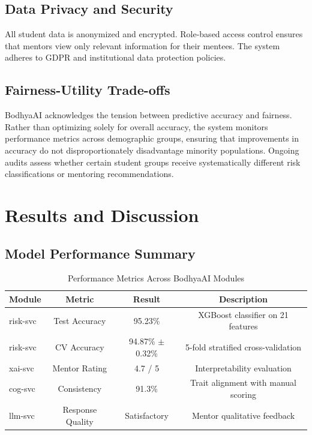 \documentclass[conference]{IEEEtran}
\begin{document}
\subsection{Data Privacy and Security}
All student data is anonymized and encrypted. Role-based access control ensures that mentors view only relevant information for their mentees. The system adheres to GDPR and institutional data protection policies.

\subsection{Fairness-Utility Trade-offs}
BodhyaAI acknowledges the tension between predictive accuracy and fairness. Rather than optimizing solely for overall accuracy, the system monitors performance metrics across demographic groups, ensuring that improvements in accuracy do not disproportionately disadvantage minority populations. Ongoing audits assess whether certain student groups receive systematically different risk classifications or mentoring recommendations.

\section{Results and Discussion}

\subsection{Model Performance Summary}
\begin{table}[H]
\centering
\caption{Performance Metrics Across BodhyaAI Modules}
\begin{tabular}{@{}lccc@{}}
\toprule
\textbf{Module} & \textbf{Metric} & \textbf{Result} & \textbf{Description} \\ \midrule
risk-svc & Test Accuracy & 95.23\% & XGBoost classifier on 21 features \\
risk-svc & CV Accuracy & 94.87\% $\pm$ 0.32\% & 5-fold stratified cross-validation \\
xai-svc & Mentor Rating & 4.7 / 5 & Interpretability evaluation \\
cog-svc & Consistency & 91.3\% & Trait alignment with manual scoring \\
llm-svc & Response Quality & Satisfactory & Mentor qualitative feedback \\ \bottomrule
\end{tabular}
\label{tab:modules}
\end{table}
\end{document}
